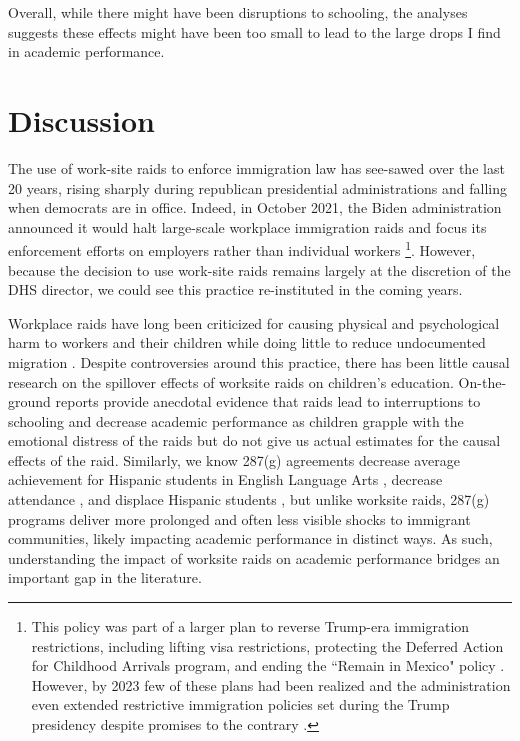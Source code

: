 \documentclass[hidelinks,twoside]{article}
\begin{document}
Overall, while there might have been disruptions to schooling, the analyses suggests these effects might have been too small to lead to the large drops I find in academic performance.


\section*{Discussion}

The use of work-site raids to enforce immigration law has see-sawed over the last 20 years, rising sharply during republican presidential administrations and falling when democrats are in office. Indeed, in October 2021, the Biden administration announced it would halt large-scale workplace immigration raids and focus its enforcement efforts on employers rather than individual workers \citep{Sullivan2021Oct}\footnote{This policy was part of a larger plan to reverse Trump-era immigration restrictions, including lifting visa restrictions, protecting the Deferred Action for Childhood Arrivals program, and ending the ``Remain in Mexico" policy \citep{apnews,krogstad_gonzalez-barrera_2022}. However, by 2023 few of these plans had been realized and the administration even extended restrictive immigration policies set during the Trump presidency despite promises to the contrary \citep{Rose2022Jan}.}. However, because the decision to use work-site raids remains largely at the discretion of the DHS director, we could see this practice re-instituted in the coming years. 

Workplace raids have long been criticized for causing physical and psychological harm to workers and their children while doing little to reduce undocumented migration \citep{tennessee_2019_tirrc,capps_2007_paying,capps_2015_implications,kitroeff_2018_workplace,juby_2011_postville}. Despite controversies around this practice, there has been little causal research on the spillover effects of worksite raids on children's education. On-the-ground reports provide anecdotal evidence that raids lead to interruptions to schooling and decrease academic performance as children grapple with the emotional distress of the raids \citep{capps_2007_paying,chaudry_2010_children} but do not give us actual estimates for the causal effects of the raid. Similarly, we know 287(g) agreements decrease average achievement for Hispanic students in English Language Arts \citep{bellows_2019_immigration}, decrease attendance \citep{bellows_2021_the}, and displace Hispanic students \citep{dee_2019_vanished}, but unlike worksite raids, 287(g) programs deliver more prolonged and often less visible shocks to immigrant communities, likely impacting academic performance in distinct ways. As such, understanding the impact of worksite raids on academic performance bridges an important gap in the literature. 
\end{document}
